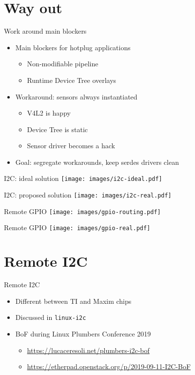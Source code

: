 \documentclass[xetex,table,aspectratio=169]{beamer}
\begin{document}
\section{Way out}

\begin{frame}{Work around main blockers}
  \begin{itemize}
  \item Main blockers for hotplug applications
    \begin{itemize}
    \item Non-modifiable pipeline
    \item Runtime Device Tree overlays
    \end{itemize}
    \pause
  \item Workaround: sensors always instantiated
    \begin{itemize}
    \item V4L2 is happy
    \item Device Tree is static
    \item Sensor driver becomes a hack
    \end{itemize}
    \pause
  \item Goal: segregate workarounds, keep serdes drivers clean
  \end{itemize}
\end{frame}

\begin{frame}{I2C: ideal solution}
  \center\texttt{[image: images/i2c-ideal.pdf]}
\end{frame}

\begin{frame}{I2C: proposed solution}
  \center\texttt{[image: images/i2c-real.pdf]}
\end{frame}

\begin{frame}{Remote GPIO}
  \center\texttt{[image: images/gpio-routing.pdf]}
\end{frame}

\begin{frame}{Remote GPIO}
  \center\texttt{[image: images/gpio-real.pdf]}
\end{frame}


\section{Remote I2C}

\begin{frame}{Remote I2C}
  \begin{itemize}
  \item Different between TI and Maxim chips
  \item Discussed in {\tt linux-i2c}
  \item BoF during Linux Plumbers Conference 2019
    \begin{itemize}
    \item \url{https://lucaceresoli.net/plumbers-i2c-bof}
    \item \url{https://etherpad.openstack.org/p/2019-09-11-I2C-BoF}
    \end{itemize}
  \end{itemize}
\end{frame}
\end{document}
